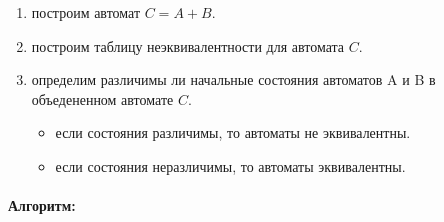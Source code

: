 \documentclass[12pt]{article}
\begin{document}
\begin{enumerate}

	\item построим автомат $C = A + B$.

	\item построим таблицу неэквивалентности для автомата $C$.

	\item определим различимы ли начальные состояния автоматов A и B в объедененном автомате $C$.
	
	\begin{itemize} 
	
		\item если состояния различимы, то автоматы не эквивалентны.

		\item если состояния неразличимы, то автоматы эквивалентны.	
	
	\end{itemize}

\end{enumerate}



\paragraph{Алгоритм:}
\end{document}
